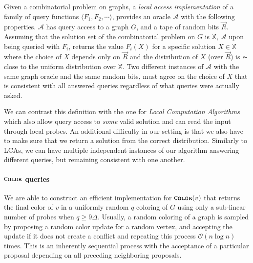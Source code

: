 \begin{definition}
\label{def:local_access_LCA}
Given a combinatorial problem on graphs,
a \emph{local access implementation} of a family of query functions $\langle F_1, F_2,\cdots \rangle$,
provides an oracle $\mathcal A$ with the following properties.
$\mathcal A$ has query access to a graph $G$, and a tape of random bits $\vec R$.
Assuming that the solution set of the combinatorial problem on $G$ is $\mathbb X$,
$\mathcal A$ upon being queried with $F_i$, returns the value $F_i(X)$ for a specific solution $X\in\mathbb X$ where the choice of $X$
depends only on $\vec R$ and the distribution of $X$ (over $\vec R$) is $\epsilon$-close to the uniform distribution over $\mathbb X$.
Two different instances of $\mathcal A$ with the same graph oracle and the same random bits,
must agree on the choice of $X$ that is consistent with all answered queries regardless of what queries were actually asked.
\end{definition}

We can contrast this definition with the one for \emph{Local Computation Algorithms} \cite{LCA}
which also allow query access to \emph{some} valid solution and can read the input through local probes.
An additional difficulty in our setting is that we also have to make sure that we return a solution from the correct distribution.
Similarly to LCAs, we can have multiple independent instances of our algorithm answering different queries, but remaining consistent with one another.


\paragraph*{$\texttt{\textsc{Color}}$ queries}
\label{par:color_queries}
We are able to construct an efficient implementation for $\texttt{\textsc{Color}}(v)$ that returns the final color of $v$
in a uniformly random $q$ coloring of $G$ using only a sub-linear number of probes when $q\ge 9\Delta$.
Usually, a random coloring of a graph is sampled by proposing a random color update for a random vertex,
and accepting the update if it does not create a conflict and repeating this process $\mathcal O(n\log n)$ times.
This is an inherently sequential process with the acceptance of a particular proposal depending on all preceding neighboring proposals.

